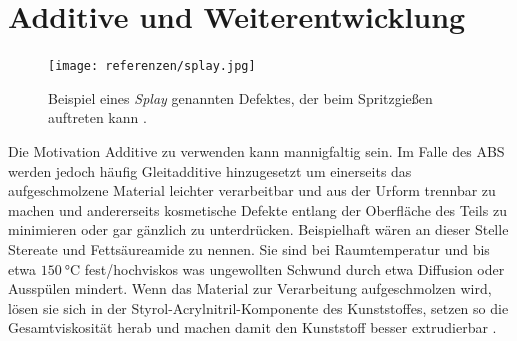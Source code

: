     \section{Additive und Weiterentwicklung}
        \begin{figure}%
            \centering
            \vspace{-\baselineskip}
            \texttt{[image: referenzen/splay.jpg]}%
            \caption[Beispiel eines Defektes beim Spritzgießen]{Beispiel eines \textit{Splay} genannten Defektes, der beim Spritzgießen auftreten kann \cite{defects.of.casting.plastic.products.2018}.}%
            \label{fig:splay}%
        \end{figure}
        Die Motivation Additive zu verwenden kann mannigfaltig sein. Im Falle des ABS werden jedoch häufig Gleitadditive
        hinzugesetzt um einerseits das aufgeschmolzene Material leichter verarbeitbar und aus der Urform trennbar zu machen
        und andererseits kosmetische Defekte entlang der Oberfläche des Teils zu minimieren oder gar gänzlich zu unterdrücken.
        Beispielhaft wären an dieser Stelle Stereate und Fettsäureamide zu nennen. Sie sind bei Raumtemperatur und bis etwa \(\SI{150}{\celsius}\)
        fest/hochviskos was ungewollten Schwund durch etwa Diffusion oder Ausspülen mindert. Wenn das Material zur Verarbeitung
        aufgeschmolzen wird, lösen sie sich in der Styrol-Acrylnitril-Komponente des Kunststoffes, setzen so die Gesamtviskosität
        herab und machen damit den Kunststoff besser extrudierbar \cite{influence.of.additives.on.flow.behavior.Blyler.1974,effects.on.ABS.by.Additives.for.3Dprinting.Torrado.2015}.
        
